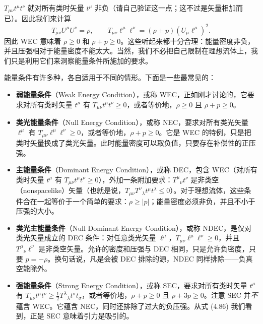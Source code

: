 $T_{\mu\nu}t^\mu t^\nu$ 就对所有类时矢量 $t^\mu$ 非负（请自己验证这一点；这不过是矢量相加而已）。因此我们来计算
\begin{equation*}
T_{\mu\nu}U^\mu U^\nu = \rho, \qquad T_{\mu\nu}\ell^\mu\ell^\nu = (\rho + p)(U_\mu \ell^\mu)^2.
\tag{4.108}
\end{equation*}
因此 WEC 意味着 $\rho \geq 0$ 和 $\rho + p \geq 0$。这些听起来都十分合理：能量密度非负，并且压强相对于能量密度不能太大。当然，我们不必把自己限制在理想流体上，我们只是利用它们来洞察能量条件所施加的要求。

能量条件有许多种，各自适用于不同的情形。下面是一些最常见的：

\begin{itemize}
\item \textbf{弱能量条件}（Weak Energy Condition），或称 WEC，正如刚才讨论的，它要求对所有类时矢量 $t^\mu$ 有 $T_{\mu\nu}t^\mu t^\nu \geq 0$，或者等价地，$\rho \geq 0$ 且 $\rho + p \geq 0$。

\item \textbf{类光能量条件}（Null Energy Condition），或称 NEC，要求对所有类光矢量 $\ell^\mu$ 有 $T_{\mu\nu}\ell^\mu\ell^\nu \geq 0$，或者等价地，$\rho + p \geq 0$。它是 WEC 的特例，只是把类时矢量换成了类光矢量。此时能量密度可以取负值，只要存在补偿性的正压强。

\item \textbf{主能量条件}（Dominant Energy Condition），或称 DEC，包含 WEC（对所有类时矢量 $t^\mu$ 有 $T_{\mu\nu}t^\mu t^\nu \geq 0$），外加一条附加要求：$T^\mu{}_\nu t^\nu$ 是非类空（nonspacelike）矢量（也就是说，$T_{\mu\nu}T^\nu{}_\lambda t^\mu t^\lambda \leq 0$）。对于理想流体，这些条件合在一起等价于一个简单的要求：$\rho \geq |p|$；能量密度必须非负，并且不小于压强的大小。

\item \textbf{类光主能量条件}（Null Dominant Energy Condition），或称 NDEC，是仅对类光矢量成立的 DEC 条件：对任意类光矢量 $\ell^\mu$，$T_{\mu\nu}\ell^\mu\ell^\nu \geq 0$，并且 $T^\mu{}_\nu \ell^\nu$ 是非类空矢量。允许的密度和压强与 DEC 相同，只是允许负密度，只要 $p = -\rho$。换句话说，凡是会被 DEC 排除的源，NDEC 同样排除——负真空能除外。

\item \textbf{强能量条件}（Strong Energy Condition），或称 SEC，要求对所有类时矢量 $t^\mu$ 有 $T_{\mu\nu}t^\mu t^\nu \geq \frac{1}{2}T^\lambda{}_\lambda t^\sigma t_\sigma$，或者等价地，$\rho + p \geq 0$ 且 $\rho + 3p \geq 0$。注意 SEC 并\emph{不}蕴含 WEC。它蕴含 NEC，同时还排除了过大的负压强。从式 (4.86) 我们看到，正是 SEC 意味着引力是吸引的。
\end{itemize}

